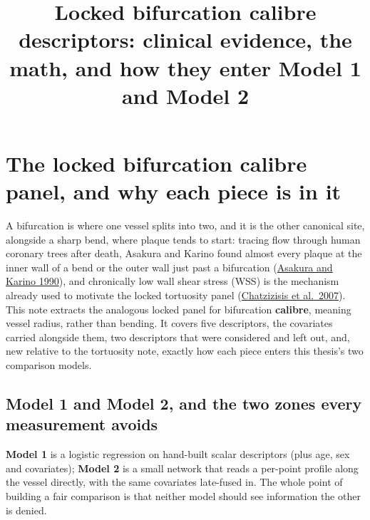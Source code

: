 \documentclass[11pt]{article}
\title{Locked bifurcation calibre descriptors: clinical evidence, the math, and how they enter Model 1 and Model 2}
\author{}
\date{}
\begin{document}
\maketitle
\vspace{-2em}

\section*{The locked bifurcation calibre panel, and why each piece is in it}

A bifurcation is where one vessel splits into two, and it is the other canonical site, alongside a
sharp bend, where plaque tends to start: tracing flow through human coronary trees after death,
Asakura and Karino found almost every plaque at the inner wall of a bend or the outer wall just past
a bifurcation (\href{https://doi.org/10.1161/01.RES.66.4.1045}{Asakura and Karino 1990}), and
chronically low wall shear stress (WSS) is the mechanism already used to motivate the locked
tortuosity panel (\href{https://doi.org/10.1016/j.jacc.2007.02.059}{Chatzizisis et al.\ 2007}). This note extracts
the analogous locked panel for bifurcation \textbf{calibre}, meaning vessel radius, rather than
bending. It covers five descriptors, the covariates carried alongside them, two descriptors that were
considered and left out, and, new relative to the tortuosity note, exactly how each piece enters
this thesis's two comparison models.

\subsection*{Model 1 and Model 2, and the two zones every measurement avoids}

\textbf{Model 1} is a logistic regression on hand-built scalar descriptors (plus age, sex and
covariates); \textbf{Model 2} is a small network that reads a per-point profile along the vessel
directly, with the same covariates late-fused in. The whole point of building a fair comparison is
that neither model should see information the other is denied.
\end{document}
